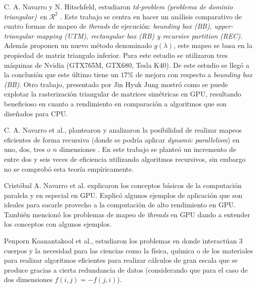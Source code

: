 \documentclass[10pt, conference, compsocconf, onecolumn]{IEEEtran}
\begin{document}
 C. A. Navarro y N. Hitschfeld, estudiaron \textit{td-problem (problema de dominio triangular)}\ en $\mathcal{R}^2$ \cite{GPUMaps2014}. Este trabajo se centra en hacer un an\'alisis comparativo de cuatro formas de mapeo de \textit{threads} de ejecuci\'on: \textit{bounding box (BB), upper-triangular mapping (UTM), rectangular box (RB) y recursive partition (REC)}. Adem\'as proponen un nuevo m\'etodo denominado $g(\lambda)$, este mapeo se basa en la propiedad de matriz triangulo inferior. Para este estudio se utilizaron tres m\'aquinas de Nvidia (GTX765M, GTX680, Tesla K40). De este estudio se lleg\'o a la conclusi\'on que este \'ultimo tiene un $17\%$ de mejora con respecto a \textit{bounding box (BB)}. Otro trabajo, presentado por Jin Hyuk Jung \cite{ExploStruct2007} mostr\'o como se puede explotar la rasterizaci\'on triangular de matrices sim\'etricas en GPU, resultando beneficioso en cuanto a rendimiento en comparaci\'on a algoritmos que son dise\~nados para CPU. 
	
 C. A. Navarro et al., plantearon y analizaron la posibilidad de realizar mapeos eficientes de forma recursiva (donde se podr\'ia aplicar \textit{dynamic parallelism}) en uno, dos, tres o $n$ dimensiones \cite{PossiRec2016}. En este trabajo se plante\'o un incremento de entre dos y seis veces de eficiencia utilizando algoritmos recursivos, sin embargo no se comprob\'o esta teor\'ia emp\'iricamente.

 Crist\'obal A. Navarro et al. \cite{ASurvey2014} explicaron los conceptos b\'asicos de la computaci\'on paralela y en especial en GPU. Explic\'o algunos ejemplos de aplicaci\'on que son ideales para sacarle provecho a la computaci\'on de alto rendimiento en GPU. Tambi\'en mencion\'o los problemas de mapeo de \textit{threads} en GPU dando a entender los conceptos con algunos ejemplos.

 Penporn Koanantakool et al., estudiaron los problemas en donde interact\'uan 3 cuerpos \cite{3body2014} y la necesidad para las ciencias como la f\'isica, qu\'imica o de los materiales para realizar algoritmos eficientes para realizar c\'alculos de gran escala que se produce gracias a cierta redundancia de datos (considerando que para el caso de dos dimensiones $f(i,j)=-f(j,i)$).




\end{document}
